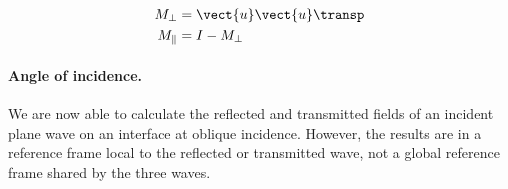 \begin{subequations}
    \begin{align}
        M_\perp &= \vect{u} \vect{u}\transp
        \label{eq:perp_decomposition_matrix}
        \\
        M_\parallel & = I - M_\perp
        \label{eq:para_decomposition_matrix}
    \end{align}
    \label{eq:para_perp_decomposition_matrix}
\end{subequations}


\paragraph{Angle of incidence.}
We are now able to calculate the reflected and transmitted fields of an incident plane wave on an interface at oblique incidence.
However, the results are in a reference frame local to the reflected or transmitted wave, not a global reference frame shared by the three waves.

